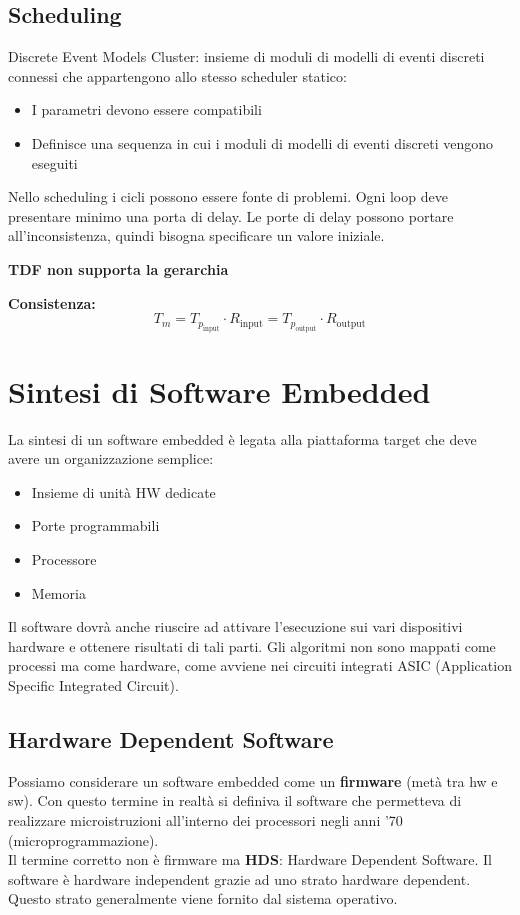 \documentclass[a4paper]{article}
\theoremstyle{definition}
\begin{document}
		\subsection{Scheduling}
			Discrete Event Models Cluster: insieme di moduli di modelli di eventi discreti connessi che appartengono allo stesso scheduler statico:
			\begin{itemize}
				\item I parametri devono essere compatibili
				\item Definisce una sequenza in cui i moduli di modelli di eventi discreti vengono eseguiti
			\end{itemize}
			
			Nello scheduling i cicli possono essere fonte di problemi. Ogni loop deve presentare minimo una porta di delay. Le porte di delay possono portare all'inconsistenza, quindi bisogna specificare un valore iniziale.
			
			\textbf{TDF non supporta la gerarchia}
			
			\textbf{Consistenza:}
			\[
				T_m = T_{p_{\text{input}}}\cdot R_{\text{input}} = T_{p_{\text{output}}}\cdot R_{\text{output}}
			\]
			
			\newpage
			
	\section{Sintesi di Software Embedded}
		La sintesi di un software embedded è legata alla piattaforma target che deve avere un organizzazione semplice:
		\begin{itemize}
			\item Insieme di unità HW dedicate
			\item Porte programmabili
			\item Processore
			\item Memoria
		\end{itemize}
		Il software dovrà anche riuscire ad attivare l'esecuzione sui vari dispositivi hardware e ottenere risultati di tali parti.
		Gli algoritmi non sono mappati come processi ma come hardware, come avviene nei circuiti integrati ASIC (Application Specific Integrated Circuit).
		
		\subsection{Hardware Dependent Software}
			Possiamo considerare un software embedded come un \textbf{firmware} (metà tra hw e sw). Con questo termine in realtà si definiva il software che permetteva di realizzare microistruzioni all'interno dei processori negli anni '70 (microprogrammazione).\\
			Il termine corretto non è firmware ma \textbf{HDS}: Hardware Dependent Software. Il software è hardware independent grazie ad uno strato hardware dependent. Questo strato generalmente viene fornito dal sistema operativo.
			
\end{document}

